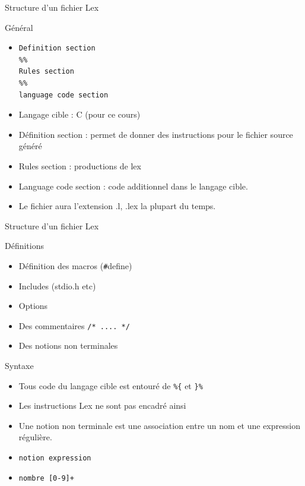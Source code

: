 \def\ftitle{Structure d'un fichier Lex}
\begin{frame}[containsverbatim]{\ftitle}
\def\blocktitle{Général}
\begin{block}{\blocktitle}
\begin{itemize}
\item \begin{verbatim}Definition section
%%
Rules section
%%
language code section
\end{verbatim}
\item Langage cible : C (pour ce cours)
\item Définition section : permet de donner des instructions pour le fichier source généré
\item Rules section : productions de lex
\item Language code section : code additionnel dans le langage cible.
\item Le fichier aura l'extension .l, .lex la plupart du temps.
\end{itemize}
\end{block}
\end{frame}

\def\ftitle{Structure d'un fichier Lex}
\begin{frame}[containsverbatim]{\ftitle}
\def\blocktitle{Définitions}
\begin{block}{\blocktitle}
\begin{itemize}
\item Définition des macros (\verb!#!define)
\item Includes (stdio.h etc)
\item Options
\item Des commentaires \verb!/* .... */!
\item Des notions non terminales
\end{itemize}
\end{block}
\def\blocktitle{Syntaxe}
\begin{block}{\blocktitle}
\begin{itemize}
\item Tous code du langage cible est entouré de \verb!%{! et \verb!}%!
\item Les instructions Lex ne sont pas encadré ainsi
\item Une notion non terminale est une association entre un nom et une expression régulière.
\item \verb!notion expression!
\item \verb!nombre [0-9]+!
\end{itemize}
\end{block}
\end{frame}


